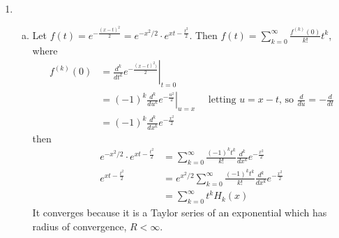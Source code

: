 \documentclass[a4paper,12pt]{article}
\theoremstyle{definition}
\begin{document}
\begin{enumerate}
\item
\begin{enumerate}[(a)]
\item Let $f(t) = e^{-\frac{(x-t)^2}{2}} = e^{-x^2/2}\cdot e^{xt-\frac{t^2}{2}}$. Then $f(t) = \sum_{k=0}^{\infty}\frac{f^{(k)}(0)}{k!}t^k$, where
\begin{align*}
f^{(k)}(0) &= \left.\frac{d^k}{dt^k}e^{-\frac{(x-t)^2)}{2}}\right|_{t=0}\\
&= \left.(-1)^k\frac{d^k}{du^k}e^{-\frac{u^2}{2}}\right|_{u=x}\quad \text{ letting $u=x-t$, so $\frac{d}{du}=-\frac{d}{dt}$}\\
&= (-1)^k\frac{d^k}{dx^k}e^{-\frac{x^2}{2}}
\end{align*}
then
\begin{align*}
e^{-x^2/2}\cdot e^{xt-\frac{t^2}{2}} &= \sum_{k=0}^{\infty}\frac{(-1)^kt^k}{k!}\frac{d^k}{dx^k}e^{-\frac{x^2}{2}}\\
e^{xt-\frac{t^2}{2}} &= e^{x^2/2}\sum_{k=0}^{\infty}\frac{(-1)^kt^k}{k!}\frac{d^k}{dx^k}e^{-\frac{x^2}{2}}\\
&= \sum_{k=0}^{\infty}t^kH_k(x)
\end{align*}
It converges because it is a Taylor series of an exponential which has radius of convergence, $R < \infty$.




\end{enumerate}
\end{enumerate}
\end{document}
